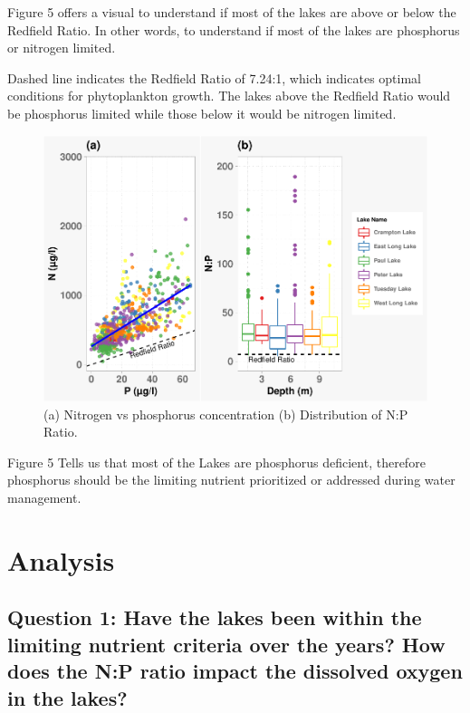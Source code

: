 \documentclass[12pt,]{article}
\begin{document}
Figure 5 offers a visual to understand if most of the lakes are above or
below the Redfield Ratio. In other words, to understand if most of the
lakes are phosphorus or nitrogen limited.

Dashed line indicates the Redfield Ratio of 7.24:1, which indicates
optimal conditions for phytoplankton growth. The lakes above the
Redfield Ratio would be phosphorus limited while those below it would be
nitrogen limited.

\begin{figure}
\centering
\includegraphics{Eadala_ENV872_Project_files/figure-latex/fig5-1.pdf}
\caption{(a) Nitrogen vs phosphorus concentration (b) Distribution of
N:P Ratio.}
\end{figure}

Figure 5 Tells us that most of the Lakes are phosphorus deficient,
therefore phosphorus should be the limiting nutrient prioritized or
addressed during water management.

\newpage

\hypertarget{analysis}{%
\section{Analysis}\label{analysis}}

\hypertarget{question-1-have-the-lakes-been-within-the-limiting-nutrient-criteria-over-the-years-how-does-the-np-ratio-impact-the-dissolved-oxygen-in-the-lakes}{%
\subsection{Question 1: Have the lakes been within the limiting nutrient
criteria over the years? How does the N:P ratio impact the dissolved
oxygen in the
lakes?}\label{question-1-have-the-lakes-been-within-the-limiting-nutrient-criteria-over-the-years-how-does-the-np-ratio-impact-the-dissolved-oxygen-in-the-lakes}}
\end{document}
